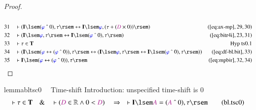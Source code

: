 \begin{proof}
\begin{align}
  \\ 31 &&  & \vdash ( \mathbf{I} \lsem ( \mw{\varphi} ~\string^~ 0 ) , \tau
      \rsem \leftrightarrow \mathbf{I} \lsem \mw{\varphi} ,
      ( \tau + ( \mc{D} \times 0 ) ) \rsem
      )&(\mbox{\ref{eq:ax-mp}},29,30)\notag
  \\ 32 &&  & \vdash ( \mathbf{I} \lsem \mw{\varphi} , \tau \rsem
      \leftrightarrow \mathbf{I} \lsem ( \mw{\varphi}
      ~\string^~ 0 ) , \tau \rsem
      )&(\mbox{\ref{eq:bitr4i}},23,31)\notag
  \\ 33 &&  & \vdash \tau \in \mathbf{T}&\text{Hyp~ts0.1}\notag%
  \\ 34 &&  & \vdash ( \mathbf{I} \lsem ( \mw{\varphi} \leftrightarrow (
      \mw{\varphi} ~\string^~ 0 ) ) , \tau \rsem
      \leftrightarrow ( \mathbf{I} \lsem \mw{\varphi} ,
      \tau \rsem \leftrightarrow \mathbf{I} \lsem (
      \mw{\varphi} ~\string^~ 0 ) , \tau \rsem )
      )&(\mbox{\ref{eq:df-bl.bit}},33)\notag
  \\ 35 &&  & \vdash \mathbf{I} \lsem ( \mw{\varphi} \leftrightarrow (
      \mw{\varphi} ~\string^~ 0 ) ) , \tau
      \rsem&(\mbox{\ref{eq:mpbir}},32,34)\notag
\end{align}
\end{proof}

\begin{restatable}{lemma}{bltsc0}~~ Time-shift Introduction: unspecified
time-shift is 0
\begin{align}
\vdash \tau \in \mathbf{T}\quad\&\quad \vdash ( \mc{D} \in \mathbb{R} \wedge 0
    < \mc{D} )\quad\Rightarrow\quad \vdash \mathbf{I} \lsem \mc{A} = ( \mc{A}
    ~\string^~ 0 ) , \tau \rsem\label{eq:bl.tsc0}\tag{bl.tsc0}
\end{align}
\end{restatable}

